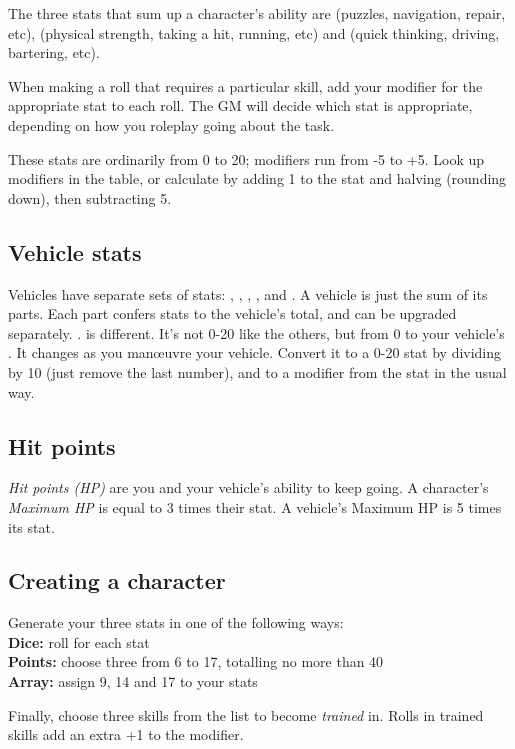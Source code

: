 \documentclass[10pt, a4paper, twocolumn]{article}
\begin{document}
The three stats that sum up a character's ability are  (puzzles,
navigation, repair,  etc),  (physical strength, taking a hit,
running, etc) and  (quick thinking, driving, bartering, etc).

When making a roll that requires a particular skill, add your modifier for the
appropriate stat to each roll. The GM will decide which stat is appropriate,
depending on how you roleplay going about the task.

These stats are ordinarily from 0 to 20; modifiers run from -5 to +5. Look up
modifiers in the table, or calculate by adding 1 to the stat and halving
(rounding down), then subtracting 5.

\subsection{Vehicle stats}
Vehicles have separate sets of stats: , ,
, ,  and . A vehicle
is just the sum of its parts. Each part confers stats to the vehicle's total,
and can be upgraded separately.
.
 is different. It's not 0-20 like the others, but from 0 to your
vehicle's . It changes as you man\oe{}uvre your vehicle.
Convert it to a 0-20 stat by dividing by 10 (just remove the last number), and
to a modifier from the stat in the usual way.

\subsection{Hit points}
\emph{Hit points (HP)} are you and your vehicle's ability to keep going. A
character's \emph{Maximum HP} is equal to 3 times their  stat. A
vehicle's Maximum HP is 5 times its  stat.

\subsection{Creating a character}
Generate your three stats in one of the following ways:\\
\textbf{Dice:} roll  for each stat\\
\textbf{Points:} choose three from 6 to 17, totalling no more than 40\\
\textbf{Array:} assign 9, 14 and 17 to your stats

Finally, choose three skills from the list to become \emph{trained} in. Rolls in
trained skills add an extra +1 to the modifier.
\end{document}
